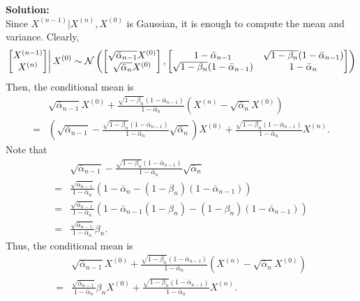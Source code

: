 \documentclass[12pt]{article}
\begin{document}
\begin{enumerate}
\begin{solution}
{\bf Solution:}\\
Since $X^{(n-1)}|X^{(n)}, X^{(0)}$ is Gaussian, it is enough to compute the mean and variance.
Clearly,
    \begin{align*}
        \left.\begin{bmatrix}
            X^{(n-1)}\\X^{(n)} 
        \end{bmatrix}
        \right| X^{(0)}
        \sim {\cal N}\left(\begin{bmatrix}\sqrt{\bar{\alpha}_{n-1}}X^{(0)} \\ \sqrt{\bar{\alpha}_{n}}X^{(0)} \\\end{bmatrix},
        \begin{bmatrix}1-\bar{\alpha}_{n-1} & \sqrt{1-\beta_n} (1-\bar{\alpha}_{n-1}) \\
        \sqrt{1-\beta_n} (1-\bar{\alpha}_{n-1}) & 1-\bar{\alpha}_n\end{bmatrix}\right)
    \end{align*}
Then, the conditional mean is
\begin{align*}
    &\sqrt{\bar{\alpha}_{n-1}} X^{(0)} +\frac{\sqrt{1-\beta_n}(1-\bar{\alpha}_{n-1})}{1-\bar{\alpha}_n} (X^{(n)} - \sqrt{\bar{\alpha}_n}X^{(0)})\nonumber\\
    =& \left(\sqrt{\bar{\alpha}_{n-1}} - \frac{\sqrt{1-\beta_n}(1-\bar{\alpha}_{n-1})}{1-\bar{\alpha}_n} \sqrt{\bar{\alpha}_n}\right) X^{(0)}
    +\frac{\sqrt{1-\beta_n}(1-\bar{\alpha}_{n-1})}{1-\bar{\alpha}_n} X^{(n)} .
\end{align*}
Note that 
\begin{align*}
    & \sqrt{\bar{\alpha}_{n-1}} - \frac{\sqrt{1-\beta_n}(1-\bar{\alpha}_{n-1})}{1-\bar{\alpha}_n} \sqrt{\bar{\alpha}_n}\nonumber\\
    =& \frac{\sqrt{\bar{\alpha}_{n-1}}}{1-\bar{\alpha}_n} (1-\bar{\alpha}_n - (1-\beta_n) (1-\bar{\alpha}_{n-1}))\\
    =& \frac{\sqrt{\bar{\alpha}_{n-1}}}{1-\bar{\alpha}_n} (1-\bar{\alpha}_{n-1}(1-\beta_n) - (1-\beta_n) (1-\bar{\alpha}_{n-1}))\\
    =& \frac{\sqrt{\bar{\alpha}_{n-1}}}{1-\bar{\alpha}_n} \beta_n.
\end{align*}
Thus, the conditional mean is
\begin{align*}
    &\sqrt{\bar{\alpha}_{n-1}} X^{(0)} +\frac{\sqrt{1-\beta_n}(1-\bar{\alpha}_{n-1})}{1-\bar{\alpha}_n} (X^{(n)} - \sqrt{\bar{\alpha}_n}X^{(0)})\nonumber\\
    =& \frac{\sqrt{\bar{\alpha}_{n-1}}}{1-\bar{\alpha}_n} \beta_n X^{(0)}
    +\frac{\sqrt{1-\beta_n}(1-\bar{\alpha}_{n-1})}{1-\bar{\alpha}_n} X^{(n)}.
\end{align*}


\end{solution}
\end{enumerate}
\end{document}
